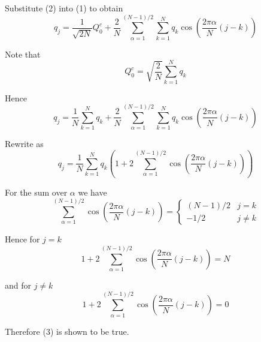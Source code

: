 \documentclass[12pt]{article}
\begin{document}
Substitute (2) into (1) to obtain
\begin{equation*}
q_j=
\frac{1}{\sqrt{2N}}Q_0^c
+
\frac{2}{N}
\sum_{\alpha=1}^{(N-1)/2}
\sum_{k=1}^N
q_k\cos\left(\frac{2\pi\alpha}{N}(j-k)\right)
\end{equation*}

Note that
\begin{equation*}
Q_0^c
=\sqrt{\frac{2}{N}}\sum_{k=1}^Nq_k
\end{equation*}

Hence
\begin{equation*}
q_j=
\frac{1}{N}\sum_{k=1}^N q_k
+
\frac{2}{N}
\sum_{\alpha=1}^{(N-1)/2}
\sum_{k=1}^N
q_k\cos\left(\frac{2\pi\alpha}{N}(j-k)\right)
\end{equation*}

Rewrite as
\begin{equation*}
q_j=\frac{1}{N}\sum_{k=1}^N q_k \left(
1+2\sum_{\alpha=1}^{(N-1)/2}
\cos\left(\frac{2\pi\alpha}{N}(j-k)\right)
\right)
\tag{3}
\end{equation*}

For the sum over $\alpha$ we have
\begin{equation*}
\sum_{\alpha=1}^{(N-1)/2}
\cos\left(\frac{2\pi\alpha}{N}(j-k)\right)
=\begin{cases}
(N-1)/2 & j=k
\\
-1/2 & j\ne k
\end{cases}
\end{equation*}

Hence for $j=k$
\begin{equation*}
1+2\sum_{\alpha=1}^{(N-1)/2}
\cos\left(\frac{2\pi\alpha}{N}(j-k)\right)
=N
\end{equation*}

and for $j\ne k$
\begin{equation*}
1+2\sum_{\alpha=1}^{(N-1)/2}
\cos\left(\frac{2\pi\alpha}{N}(j-k)\right)
=0
\end{equation*}

Therefore (3) is shown to be true.
\end{document}
